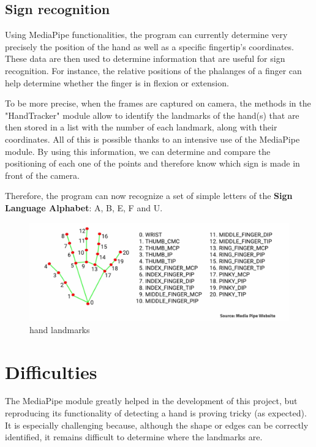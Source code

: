 \documentclass{article}
\begin{document}
	\subsection{Sign recognition}\label{sec:first}
Using MediaPipe functionalities, the program can currently determine very precisely the position of the hand as well as a specific fingertip's coordinates. These data are then used to determine information that are useful for sign recognition. For instance, the relative positions of the phalanges of a finger can help determine whether the finger is in flexion or extension.

To be more precise, when the frames are captured on camera, the methods in the "HandTracker" module allow to identify the landmarks of the hand(s) that are then stored in a list with the number of each landmark, along with their coordinates. All of this is possible thanks to an intensive use of the MediaPipe module. By using this information, we can determine and compare the positioning of each one of the points and therefore know which sign is made in front of the camera.

Therefore, the program can now recognize a set of simple letters of the \textbf{Sign Language Alphabet}: A, B, E, F and U.

	\begin{figure}[h!]
		\center
		\includegraphics[width=\linewidth]{landmarks.png}
		\caption{ hand landmarks}
	\end{figure}


	\newpage

	
	\section{Difficulties}\label{sec:third}
	The MediaPipe module greatly helped in the development of this project, but reproducing its functionality of detecting a hand is proving tricky (as expected).  It is especially challenging because, although the shape or edges can be correctly identified, it remains difficult to determine where the landmarks are.
\end{document}
